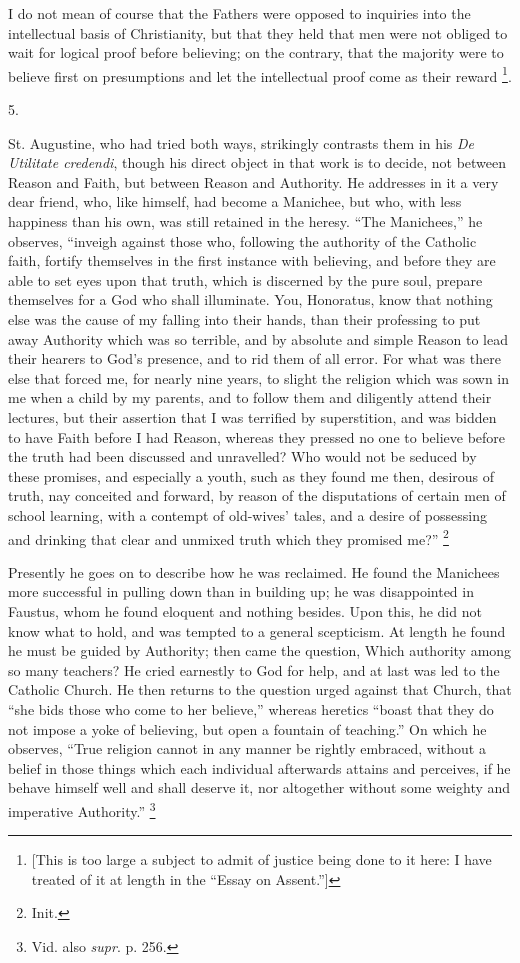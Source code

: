 I do not mean of course that the Fathers were opposed to inquiries
into the intellectual basis of Christianity, but that they held that
men were not obliged to wait for logical proof before believing; on
the contrary, that the majority were to believe first on presumptions
and let the intellectual proof come as their reward \footnote{[This is too large a subject to admit of
justice being done to it here: I have treated of it at length in the
``Essay on Assent.'']}.

5.

St. Augustine, who had tried both ways, strikingly contrasts them
in his \emph{De Utilitate credendi}, though his direct object in that
work is to decide, not between Reason and Faith, but between Reason
and Authority. He addresses in it a very dear friend, who, like
himself, had become a Manichee, but who, with less happiness than his
own, was still retained in the heresy. ``The Manichees,'' he
observes, ``inveigh against those who, following the authority of
the Catholic faith, fortify themselves in the first instance with
believing, and before they are able to set eyes upon that truth, which
is discerned by the pure soul, prepare themselves for a God who shall
illuminate. You, Honoratus, know that nothing else was the cause of my
falling into their hands, than their professing to put away Authority
which was so terrible, and by absolute and simple Reason to lead their
hearers to God's presence, and to rid them of all error. For what was
there else that forced me, for nearly nine years, to slight the
religion which was sown in me when a child by my parents, and to
follow them and diligently attend their lectures, but their assertion
that I was terrified by superstition, and was bidden to have Faith
before I had Reason, whereas they pressed no one to believe before the
truth had been discussed and unravelled? Who would not be seduced by
these promises, and especially a youth, such as they found me then,
desirous of truth, nay conceited and forward, by reason of the
disputations of certain men of school learning, with a contempt of
old-wives' tales, and a desire of possessing and drinking that clear
and unmixed truth which they promised me?'' \footnote{Init.}

Presently he goes on to describe how he was reclaimed. He found the
Manichees more successful in pulling down than in building up; he was
disappointed in Faustus, whom he found eloquent and nothing besides.
Upon this, he did not know what to hold, and was tempted to a general
scepticism. At length he found he must be guided by Authority; then
came the question, Which authority among so many teachers? He cried
earnestly to God for help, and at last was led to the Catholic Church.
He then returns to the question urged against that Church, that
``she bids those who come to her believe,'' whereas heretics
``boast that they do not impose a yoke of believing, but open a
fountain of teaching.'' On which he observes, ``True religion
cannot in any manner be rightly embraced, without a belief in those
things which each individual afterwards attains and perceives, if he
behave himself well and shall deserve it, nor altogether without some
weighty and imperative Authority.'' \footnote{Vid. also \emph{supr}. p. 256.}


